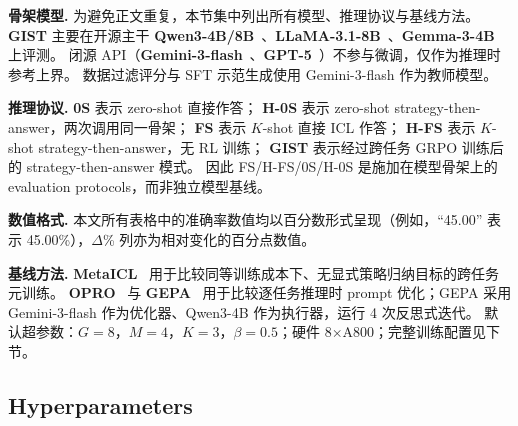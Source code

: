 \documentclass[11pt]{article}
\newcommand{\gist}{\textbf{GIST}}
\begin{document}
\textbf{骨架模型.}
为避免正文重复，本节集中列出所有模型、推理协议与基线方法。
\gist{} 主要在开源主干 \textbf{Qwen3-4B/8B}~\citep{yang2025qwen3technicalreport}、\textbf{LLaMA-3.1-8B}~\citep{dubey2024llama3}、\textbf{Gemma-3-4B}~\citep{gemmateam2025gemma3} 上评测。
闭源 API（\textbf{Gemini-3-flash}~\citep{google2025gemini3flash}、\textbf{GPT-5}~\citep{openai2025gpt54}）不参与微调，仅作为推理时参考上界。
数据过滤评分与 SFT 示范生成使用 Gemini-3-flash 作为教师模型。

\textbf{推理协议.}
\textbf{0S} 表示 zero-shot 直接作答；
\textbf{H-0S} 表示 zero-shot strategy-then-answer，两次调用同一骨架；
\textbf{FS} 表示 $K$-shot 直接 ICL 作答；
\textbf{H-FS} 表示 $K$-shot strategy-then-answer，无 RL 训练；
\textbf{\gist{}} 表示经过跨任务 GRPO 训练后的 strategy-then-answer 模式。
因此 FS/H-FS/0S/H-0S 是施加在模型骨架上的 evaluation protocols，而非独立模型基线。

\textbf{数值格式.}
本文所有表格中的准确率数值均以百分数形式呈现（例如，``45.00'' 表示 45.00\%），$\Delta$\% 列亦为相对变化的百分点数值。

\textbf{基线方法.}
\textbf{MetaICL}~\citep{min2022metaicl} 用于比较同等训练成本下、无显式策略归纳目标的跨任务元训练。
\textbf{OPRO}~\citep{yang2024opro} 与 \textbf{GEPA}~\citep{agrawal2025gepa} 用于比较逐任务推理时 prompt 优化；GEPA 采用 Gemini-3-flash 作为优化器、Qwen3-4B 作为执行器，运行 4 次反思式迭代。
默认超参数：$G{=}8$，$M{=}4$，$K{=}3$，$\beta{=}0.5$；硬件 8$\times$A800；完整训练配置见下节。

\subsection{Hyperparameters}
\end{document}
